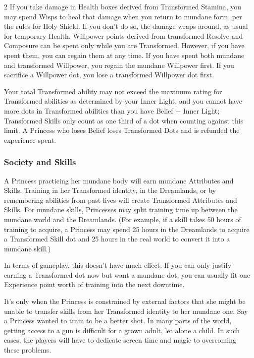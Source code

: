 \begin{multicols}{2}
If you take damage in Health boxes derived from Transformed Stamina, you may spend Wisps to heal that damage when you return to mundane form, per the rules for Holy Shield. If you don't do so, the damage wraps around, as usual for temporary Health. Willpower points derived from transformed Resolve and Composure can be spent only while you are Transformed. However, if you have spent them, you can regain them at any time. If you have spent both mundane and transformed Willpower, you regain the mundane Willpower first. If you sacrifice a Willpower dot, you lose a transformed Willpower dot first.

Your total Transformed ability may not exceed the maximum rating for Transformed abilities as determined by your Inner Light, and you cannot have more dots in Transformed abilities than you have Belief + Inner Light; Transformed Skills only count as one third of a dot when counting against this limit. A Princess who loses Belief loses Transformed Dots and is refunded the experience spent.

\begin{mybox}

\subsubsection*{Society and Skills}

A Princess practicing her mundane body will earn mundane Attributes and Skills. Training in her Transformed identity, in the Dreamlands, or by remembering abilities from past lives will create Transformed Attributes and Skills. For mundane skills, Princesses may split training time up between the mundane world and the Dreamlands. (For example, if a skill takes 50 hours of training to acquire, a Princess may spend 25 hours in the Dreamlands to acquire a Transformed Skill dot and 25 hours in the real world to convert it into a mundane skill.) 

In terms of gameplay, this doesn’t have much effect. If you can only justify earning a Transformed dot now but want a mundane dot, you can usually fit one Experience point worth of training into the next downtime. 

It's only when the Princess is constrained by external factors that she might be unable to transfer skills from her Transformed identity to her mundane one. Say a Princess wanted to train to be a better shot. In many parts of the world, getting access to a gun is difficult for a grown adult, let alone a child. In such cases, the players will have to dedicate screen time and magic to overcoming these problems.


\end{mybox}
\end{multicols}
